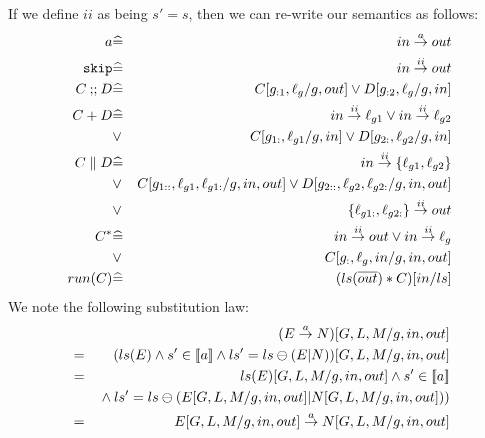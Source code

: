 If we define $ii$ as being  $s'=s$,
then we can re-write our semantics as follows:
\begin{eqnarray*}
   a
   &\widehat=&
   in \stackrel{a}{\rightarrow} out
\\ \texttt{skip}
   &\widehat=&
   in \stackrel{ii}{\rightarrow} out
\\ C \mathbin{;\!;} D
   &\widehat=&
   C[g_{:1},\ell_g/g,out] \lor D[g_{:2},\ell_g/g,in]
\\ C + D
   &\widehat=&
   in \stackrel{ii}{\rightarrow} \ell_{g1} \lor in \stackrel{ii}{\rightarrow} \ell_{g2}
\\ &\lor&
   C[g_{1:},\ell_{g1}/g,in] \lor D[g_{2:},\ell_{g2}/g,in]
\\ C \parallel D
   &\widehat=&
   in \stackrel{ii}{\rightarrow} \{\ell_{g1},\ell_{g2}\}
\\ &\lor&
   C[g_{1::},\ell_{g1},\ell_{g1:}/g,in,out]
   \lor D[g_{2::},\ell_{g2},\ell_{g2:}/g,in,out]
\\ &\lor&
   \{\ell_{g1:},\ell_{g2:}\}
   \stackrel{ii}{\rightarrow}
   out
\\ C^*
   &\widehat=&
   in \stackrel{ii}{\rightarrow} out
   \lor
   in \stackrel{ii}{\rightarrow} \ell_g
\\ &\lor&
   C[g_{:},\ell_g,in/g,in,out]
\\ run(C)
   &\widehat=&
   ( ls(\overline{out}) * C)[in/ls]
\end{eqnarray*}
We note the following substitution law:
\begin{eqnarray*}
  && (E \stackrel{a}{\rightarrow} N)[G,L,M/g,in,out]
\\&=& (ls(E) \land s' \in [\![{a}]\!] \land ls'=ls\ominus(E|N))[G,L,M/g,in,out]
\\&=& ls(E)[G,L,M/g,in,out]
       \land s' \in [\![{a}]\!]
\\&& {}\land ls'=ls\ominus(E[G,L,M/g,in,out]|N[G,L,M/g,in,out]))
\\&=& E[G,L,M/g,in,out] \stackrel{a}{\rightarrow} N[G,L,M/g,in,out]
\end{eqnarray*}
